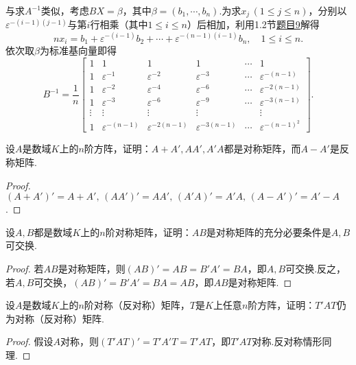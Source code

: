 \begin{sol}[(求$B^{-1}$)]
	与求$A^{-1}$类似，考虑$BX=\beta$，其中$\beta=(b_1,\cdots,b_n)$.为求$x_j\,(1\le j\le n)$，分别以$\varepsilon^{-(i-1)(j-1)}$与第$i$行相乘（其中$1\le i\le n$）后相加，利用1.2节\hyperlink{UnitRootAddict}{题目9}解得
	\[
		nx_i=b_1+\varepsilon^{-(i-1)}b_2+\cdots+\varepsilon^{-(n-1)(i-1)}b_n,\quad 1\le i\le n.
	\]
	依次取$\beta$为标准基向量即得
	\[B^{-1}=\frac{1}{n}
		\begin{bmatrix}
			1      & 1                    & 1                     & 1                     & \cdots & 1                      \\
			1      & \varepsilon^{-1}     & \varepsilon^{-2}      & \varepsilon^{-3}      & \cdots & \varepsilon^{-(n-1)}   \\
			1      & \varepsilon^{-2}     & \varepsilon^{-4}      & \varepsilon^{-6}      & \cdots & \varepsilon^{-2(n-1)}  \\
			1      & \varepsilon^{-3}     & \varepsilon^{-6}      & \varepsilon^{-9}      & \cdots & \varepsilon^{-3(n-1)}  \\
			\vdots & \vdots               & \vdots                & \vdots                &        & \vdots                 \\
			1      & \varepsilon^{-(n-1)} & \varepsilon^{-2(n-1)} & \varepsilon^{-3(n-1)} & \cdots & \varepsilon^{-(n-1)^2}
		\end{bmatrix}.
	\]
\end{sol}
\begin{prob}[15]
	设$A$是数域$K$上的$n$阶方阵，证明：$A+A',AA',A'A$都是对称矩阵，而$A-A'$是反称矩阵.
\end{prob}
\begin{proof}
	$(A+A')'=A+A',\,(AA')'=AA',\,(A'A)'=A'A,\,(A-A')'=A'-A$.
\end{proof}
\begin{prob}[16]
	设$A,B$都是数域$K$上的$n$阶对称矩阵，证明：$AB$是对称矩阵的充分必要条件是$A,B$可交换.
\end{prob}
\begin{proof}
	若$AB$是对称矩阵，则$(AB)'=AB=B'A'=BA$，即$A,B$可交换.反之，若$A,B$可交换，$(AB)'=B'A'=BA=AB$，即$AB$是对称矩阵.
\end{proof}
\begin{prob}[17]
	设$A$是数域$K$上的$n$阶对称（反对称）矩阵，$T$是$K$上任意$n$阶方阵，证明：$T'AT$仍为对称（反对称）矩阵.
\end{prob}
\begin{proof}
	假设$A$对称，则$(T'AT)'=T'A'T=T'AT$，即$T'AT$对称.反对称情形同理.
\end{proof}
